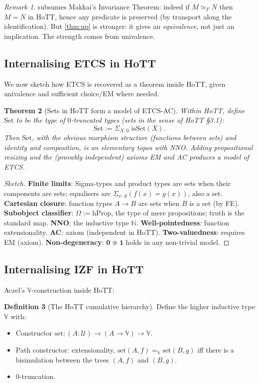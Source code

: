 \documentclass[12pt]{article}
\newtheorem{theorem}{Theorem}[section]
\theoremstyle{definition}
\newtheorem{definition}[theorem]{Definition}
\theoremstyle{remark}
\newtheorem{remark}[theorem]{Remark}
\begin{document}
\begin{remark}
 subsumes Makkai's Invariance Theorem: indeed if $M\simeq_F N$ then
$M=N$ in HoTT, hence any predicate is preserved (by transport along the identification).
But \cref{thm:up} is stronger: it gives an \emph{equivalence}, not just an implication.
The strength comes from univalence.
\end{remark}

\subsection{Internalising ETCS in HoTT}

We now sketch how ETCS is recovered as a theorem inside HoTT, given univalence and
sufficient choice/EM where needed.

\begin{theorem}[Sets in HoTT form a model of ETCS-AC]
\label{thm:setsmodel}
Within HoTT, define $\mathrm{Set}$ to be the type of $0$-truncated types (sets in the
sense of HoTT \S3.1):
\[
\mathrm{Set} := \Sigma_{X:\mathcal{U}}\,\mathrm{isSet}(X).
\]
Then $\mathrm{Set}$, with the obvious morphism structure (functions between sets) and
identity and composition, is an elementary topos with NNO. Adding propositional resizing and
the (provably independent) axioms EM and AC produces a model of ETCS.
\end{theorem}
\begin{proof}[Sketch]
\textbf{Finite limits}: Sigma-types and product types are sets when their components are
sets; equalisers are $\Sigma_{x:A} (f(x) = g(x))$, also a set.
\textbf{Cartesian closure}: function types $A\to B$ are sets when $B$ is a set (by FE).
\textbf{Subobject classifier}: $\Omega := \mathrm{hProp}$, the type of mere propositions;
truth is the standard map.
\textbf{NNO}: the inductive type $\mathbb{N}$.
\textbf{Well-pointedness}: function extensionality.
\textbf{AC}: axiom (independent in HoTT).
\textbf{Two-valuedness}: requires EM (axiom).
\textbf{Non-degeneracy}: $\mathbf{0}\not\simeq\mathbf{1}$ holds in any non-trivial model.
\end{proof}

\subsection{Internalising IZF in HoTT}

Aczel's $\mathbb{V}$-construction inside HoTT:

\begin{definition}[The HoTT cumulative hierarchy]
\label{def:vhott}
Define the higher inductive type $\mathbb{V}$ with:
\begin{itemize}
\item Constructor $\mathrm{set}: (A:\mathcal{U}) \to (A\to \mathbb{V})\to \mathbb{V}$.
\item Path constructor: extensionality, $\mathrm{set}(A,f) =_{\mathbb{V}} \mathrm{set}(B,g)$
iff there is a bisimulation between the trees $(A,f)$ and $(B,g)$.
\item $0$-truncation.
\end{itemize}
\end{definition}
\end{document}
